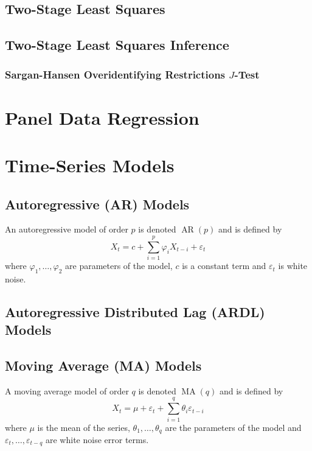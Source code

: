 \documentclass[11pt]{report} %
\begin{document}
\subsection{Two-Stage Least Squares}


\subsection{Two-Stage Least Squares Inference}


\subsubsection{Sargan-Hansen Overidentifying Restrictions $J$-Test \cite{Stock2015, Verbeek2017, Hill2011, Hayashi2000}}


\section{Panel Data Regression}

\section{Time-Series Models}

\subsection{Autoregressive (AR) Models}
An autoregressive model of order $p$ is denoted $\operatorname{AR}\left(p\right)$ and is defined by
\begin{equation}
X_{t} = c + \sum_{i = 1}^{p}\varphi_{i}X_{t - i} + \varepsilon_{t}
\end{equation}
where $\varphi_{1}, \dots, \varphi_{2}$ are parameters of the model, $c$ is a constant term and $\varepsilon_{t}$ is white noise.

\subsection{Autoregressive Distributed Lag (ARDL) Models}

\subsection{Moving Average (MA) Models}
A moving average model of order $q$ is denoted $\operatorname{MA}\left(q\right)$ and is defined by
\begin{equation}
X_{t} = \mu + \varepsilon_{t} + \sum_{i = 1}^{q}\theta_{i}\varepsilon_{t - i}
\end{equation}
where $\mu$ is the mean of the series, $\theta_{1}, \dots, \theta_{q}$ are the parameters of the model and $\varepsilon_{t}, \dots, \varepsilon_{t - q}$ are white noise error terms.
\end{document}
